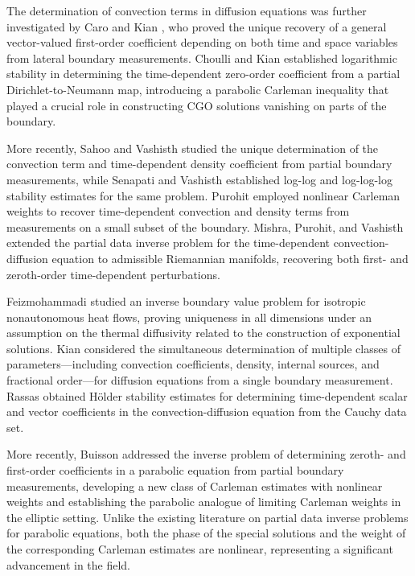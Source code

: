 \documentclass[10pt,a4paper]{amsart}
\begin{document}
The determination of convection terms in diffusion equations was further investigated
by Caro and Kian \cite{arXiv:1812.08495}, who proved the unique recovery of a general vector-valued
first-order coefficient depending on both time and space variables
from lateral boundary measurements. Choulli and Kian \cite{zbMATH06869653} established logarithmic stability in determining the time-dependent zero-order coefficient from a partial Dirichlet-to-Neumann map, introducing a parabolic Carleman inequality that played a crucial role in constructing CGO solutions vanishing on parts of the boundary.

More recently, Sahoo and Vashisth \cite{zbMATH07170240} studied the unique determination of the convection term and time-dependent density coefficient from partial boundary measurements, while Senapati and Vashisth \cite{zbMATH07597186} established log-log and log-log-log stability estimates for the same problem. Purohit \cite{zbMATH08020896} employed nonlinear Carleman weights to recover time-dependent convection and density terms from measurements on a small subset of the boundary. Mishra, Purohit, and Vashisth \cite{zbMATH08109740} extended the partial data inverse problem for the time-dependent convection-diffusion equation to admissible Riemannian manifolds, recovering both first- and zeroth-order time-dependent perturbations.

Feizmohammadi \cite{zbMATH07802400} studied an inverse boundary value problem for isotropic nonautonomous heat flows, proving uniqueness in all dimensions under an assumption on the thermal diffusivity related to the construction of exponential solutions. Kian \cite{zbMATH07543698} considered the simultaneous determination of multiple classes of parameters---including convection coefficients, density, internal sources, and fractional order---for diffusion equations from a single boundary measurement. Rassas \cite{zbMATH07829439} obtained H\"older stability estimates for determining time-dependent scalar and vector coefficients in the convection-diffusion equation from the Cauchy data set.

More recently, Buisson \cite{arXiv:2607.13778} addressed the inverse problem of determining zeroth- and first-order coefficients in a parabolic equation from partial boundary measurements, developing a new class of Carleman estimates with nonlinear weights and establishing the parabolic analogue of limiting Carleman weights in the elliptic setting. Unlike the existing literature on partial data inverse problems for parabolic equations, both the phase of the special solutions and the weight of the corresponding Carleman estimates are nonlinear, representing a significant advancement in the field.
\end{document}
